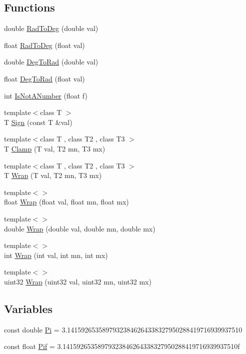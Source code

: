 \subsection*{Functions}
\begin{DoxyCompactItemize}
\item 
double \hyperlink{namespaceFMath_a3f3ff4d162ca9b81672ab8d5ce1a04ed}{RadToDeg} (double val)
\item 
float \hyperlink{namespaceFMath_a126a39f30047703acd42ac277e688959}{RadToDeg} (float val)
\item 
double \hyperlink{namespaceFMath_a85780db77107aa93459019cd8cb8e89b}{DegToRad} (double val)
\item 
float \hyperlink{namespaceFMath_a0d5dc4a5370d82235d4e62cdd510c31c}{DegToRad} (float val)
\item 
int \hyperlink{namespaceFMath_af07527201a796f5c30c8bc10db7a8178}{IsNotANumber} (float f)
\item 
{\footnotesize template$<$class T $>$ }\\T \hyperlink{namespaceFMath_a91e13509444b0d8729b8ed769b9de092}{Sign} (const T \&val)
\item 
{\footnotesize template$<$class T , class T2 , class T3 $>$ }\\T \hyperlink{namespaceFMath_a11c7de43d322da60b90898a62123eaf1}{Clamp} (T val, T2 mn, T3 mx)
\item 
{\footnotesize template$<$class T , class T2 , class T3 $>$ }\\T \hyperlink{namespaceFMath_a2f5eca80aa5529d47c4d4a152440b7aa}{Wrap} (T val, T2 mn, T3 mx)
\item 
{\footnotesize template$<$$>$ }\\float \hyperlink{namespaceFMath_a8166cc70ac2a4ff3e424b16ef7afcbfc}{Wrap} (float val, float mn, float mx)
\item 
{\footnotesize template$<$$>$ }\\double \hyperlink{namespaceFMath_ad4db85c2816cc6a8a77dd502f922c05d}{Wrap} (double val, double mn, double mx)
\item 
{\footnotesize template$<$$>$ }\\int \hyperlink{namespaceFMath_a338a56e70ba9aaae081c58aa175183e2}{Wrap} (int val, int mn, int mx)
\item 
{\footnotesize template$<$$>$ }\\uint32 \hyperlink{namespaceFMath_a3c79bbb04b20622258f981122eaa2a52}{Wrap} (uint32 val, uint32 mn, uint32 mx)
\end{DoxyCompactItemize}
\subsection*{Variables}
\begin{DoxyCompactItemize}
\item 
const double \hyperlink{namespaceFMath_a4c8e25df39e90e06ce866c1b509b9bec}{Pi} = 3.14159265358979323846264338327950288419716939937510
\item 
const float \hyperlink{namespaceFMath_aafd87a7033f63650d2fa9a7ce9f256ea}{Pif} = 3.14159265358979323846264338327950288419716939937510f
\end{DoxyCompactItemize}



